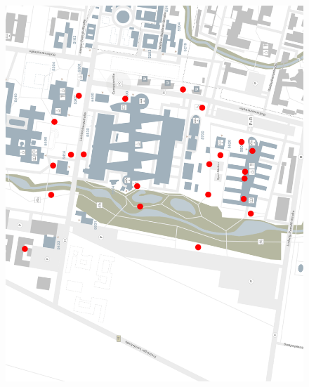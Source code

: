 \documentclass[20pt,a4paper,ngerman]{scrbook}
\begin{document}
{\begin{description}
		\end{description}
		\newpage
		\begin{figure}
			\includegraphics[width = \textwidth ]{Karte_neu_nur_punkte}
		\end{figure}
		\clearpage
	}

	
	
	
	
\end{document}
